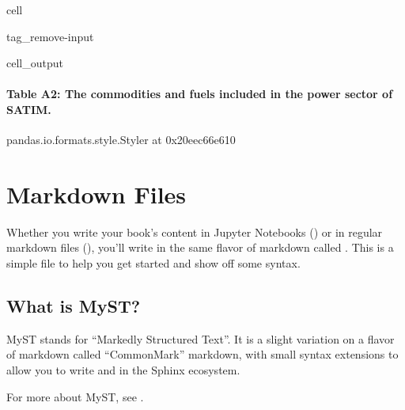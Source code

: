 \documentclass[letterpaper,10pt,english]{jupyterBook}
\begin{document}
\begin{sphinxuseclass}{cell}
\begin{sphinxuseclass}{tag_remove-input}\begin{sphinxVerbatimOutput}

\begin{sphinxuseclass}{cell_output}\subsubsection*{Table A2: The commodities and fuels included in the power sector of SATIM.}

\begin{sphinxVerbatim}[commandchars=\\\{\}]
\PYGZlt{}pandas.io.formats.style.Styler at 0x20eec66e610\PYGZgt{}
\end{sphinxVerbatim}

\end{sphinxuseclass}\end{sphinxVerbatimOutput}

\end{sphinxuseclass}
\end{sphinxuseclass}
\sphinxstepscope


\chapter{Markdown Files}
\label{\detokenize{markdown:markdown-files}}\label{\detokenize{markdown::doc}}
\sphinxAtStartPar
Whether you write your book’s content in Jupyter Notebooks () or
in regular markdown files (), you’ll write in the same flavor of markdown
called .
This is a simple file to help you get started and show off some syntax.


\section{What is MyST?}
\label{\detokenize{markdown:what-is-myst}}
\sphinxAtStartPar
MyST stands for “Markedly Structured Text”. It
is a slight variation on a flavor of markdown called “CommonMark” markdown,
with small syntax extensions to allow you to write  and 
in the Sphinx ecosystem.

\sphinxAtStartPar
For more about MyST, see .
\end{document}
